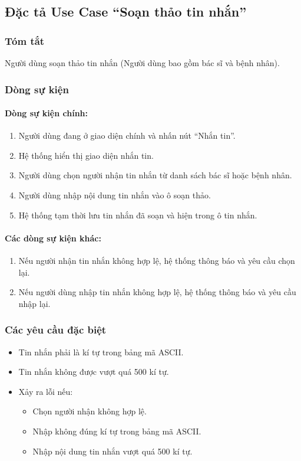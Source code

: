 \subsection{Đặc tả Use Case ``Soạn thảo tin nhắn''}

\subsubsection{Tóm tắt}
Người dùng soạn thảo tin nhắn (Người dùng bao gồm bác sĩ và bệnh nhân).

\subsubsection{Dòng sự kiện}
\paragraph{\textbf{Dòng sự kiện chính:}}
\begin{enumerate}
  \item Người dùng đang ở giao diện chính và nhấn nút ``Nhắn tin''.
  \item Hệ thống hiển thị giao diện nhắn tin.
  \item Người dùng chọn người nhận tin nhắn từ danh sách bác sĩ hoặc bệnh nhân.
  \item Người dùng nhập nội dung tin nhắn vào ô soạn thảo.
  \item Hệ thống tạm thời lưu tin nhắn đã soạn và hiện trong ô tin nhắn.
\end{enumerate}

\paragraph{\textbf{Các dòng sự kiện khác:}}
\begin{enumerate}
  \item Nếu người nhận tin nhắn không hợp lệ, hệ thống thông báo và yêu cầu chọn lại.
  \item Nếu người dùng nhập tin nhắn không hợp lệ, hệ thống thông báo và yêu cầu nhập lại.
\end{enumerate}

\subsubsection{Các yêu cầu đặc biệt}
\begin{itemize}
  \item Tin nhắn phải là kí tự trong bảng mã ASCII.
  \item Tin nhắn không được vượt quá 500 kí tự.
  \item Xảy ra lỗi nếu:
    \begin{itemize}
      \item Chọn người nhận không hợp lệ.
      \item Nhập không đúng kí tự trong bảng mã ASCII.
      \item Nhập nội dung tin nhắn vượt quá 500 kí tự.
    \end{itemize}
\end{itemize}

